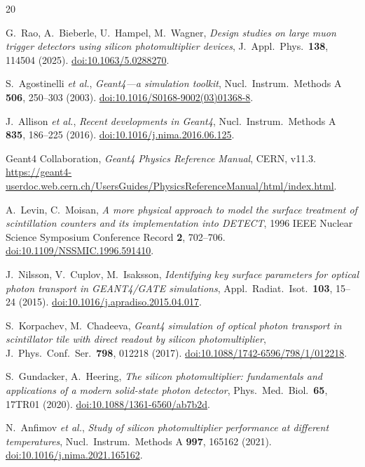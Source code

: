 \documentclass[11pt,a4paper]{article}
\begin{document}
\begin{thebibliography}{20}

G.~Rao, A.~Bieberle, U.~Hampel, M.~Wagner,
\emph{Design studies on large muon trigger detectors using silicon photomultiplier devices},
J.~Appl.\ Phys.\ \textbf{138}, 114504 (2025).
\href{https://doi.org/10.1063/5.0288270}{doi:10.1063/5.0288270}.

S.~Agostinelli \emph{et al.},
\emph{Geant4---a simulation toolkit},
Nucl.\ Instrum.\ Methods A \textbf{506}, 250--303 (2003).
\href{https://doi.org/10.1016/S0168-9002(03)01368-8}{doi:10.1016/S0168-9002(03)01368-8}.

J.~Allison \emph{et al.},
\emph{Recent developments in Geant4},
Nucl.\ Instrum.\ Methods A \textbf{835}, 186--225 (2016).
\href{https://doi.org/10.1016/j.nima.2016.06.125}{doi:10.1016/j.nima.2016.06.125}.

Geant4 Collaboration,
\emph{Geant4 Physics Reference Manual}, CERN, v11.3.
\url{https://geant4-userdoc.web.cern.ch/UsersGuides/PhysicsReferenceManual/html/index.html}.

A.~Levin, C.~Moisan,
\emph{A more physical approach to model the surface treatment of scintillation
counters and its implementation into DETECT},
1996 IEEE Nuclear Science Symposium Conference Record \textbf{2}, 702--706.
\href{https://doi.org/10.1109/NSSMIC.1996.591410}{doi:10.1109/NSSMIC.1996.591410}.

J.~Nilsson, V.~Cuplov, M.~Isaksson,
\emph{Identifying key surface parameters for optical photon transport in
GEANT4/GATE simulations},
Appl.\ Radiat.\ Isot.\ \textbf{103}, 15--24 (2015).
\href{https://doi.org/10.1016/j.apradiso.2015.04.017}{doi:10.1016/j.apradiso.2015.04.017}.

S.~Korpachev, M.~Chadeeva,
\emph{Geant4 simulation of optical photon transport in scintillator tile with
direct readout by silicon photomultiplier},
J.\ Phys.\ Conf.\ Ser.\ \textbf{798}, 012218 (2017).
\href{https://doi.org/10.1088/1742-6596/798/1/012218}{doi:10.1088/1742-6596/798/1/012218}.

S.~Gundacker, A.~Heering,
\emph{The silicon photomultiplier: fundamentals and applications of a modern
solid-state photon detector},
Phys.\ Med.\ Biol.\ \textbf{65}, 17TR01 (2020).
\href{https://doi.org/10.1088/1361-6560/ab7b2d}{doi:10.1088/1361-6560/ab7b2d}.

N.~Anfimov \emph{et al.},
\emph{Study of silicon photomultiplier performance at different temperatures},
Nucl.\ Instrum.\ Methods A \textbf{997}, 165162 (2021).
\href{https://doi.org/10.1016/j.nima.2021.165162}{doi:10.1016/j.nima.2021.165162}.


\end{thebibliography}
\end{document}
